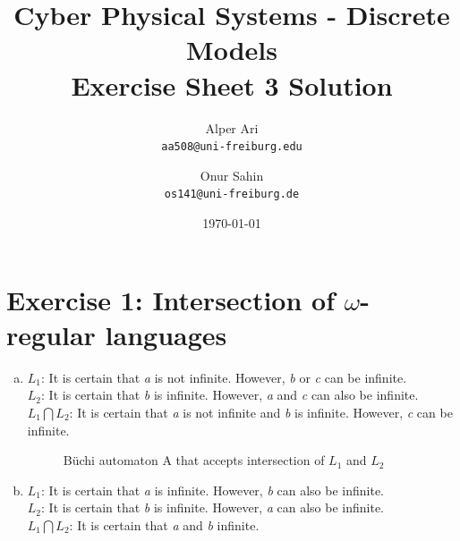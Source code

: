 \documentclass{article}
\title{
Cyber Physical Systems - Discrete Models \\
[0.2em]Exercise Sheet 3 Solution
}
\author{
  Alper Ari\\
  \texttt{aa508@uni-freiburg.edu}
  \and
  Onur Sahin\\
  \texttt{os141@uni-freiburg.de}
}
\date{\today}
\begin{document}
\maketitle

\section*{Exercise 1: Intersection of $\omega$-regular languages}
\begin{enumerate}[(a)]
     \item{
        $L_1$: It is certain that \textit{a} is not infinite. However, \textit{b} or \textit{c} can be infinite.\\
        $L_2$: It is certain that \textit{b} is infinite. However, \textit{a} and \textit{c} can also be infinite.\\
        $L_1 \bigcap L_2$: It is certain that \textit{a} is not infinite and \textit{b} is infinite. However, \textit{c} can be infinite.
     }
     \begin{figure}[ht] %
        \centering %
        \caption{Büchi automaton A that accepts intersection of $L_1$ and $L_2$ }
        \label{fig:state-machine-l1}
    \end{figure}

    \item{
        $L_1$: It is certain that \textit{a} is infinite. However, \textit{b} can also be infinite.\\
        $L_2$: It is certain that \textit{b} is infinite. However, \textit{a} can also be infinite.\\
        $L_1 \bigcap L_2$: It is certain that \textit{a} and \textit{b} infinite.
    }
     \begin{figure}[ht] %
        \centering %
\end{figure}
\end{enumerate}
\end{document}
